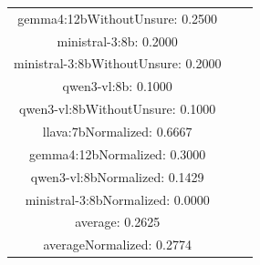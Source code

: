 \documentclass[a4paper]{article}
\begin{document}
\begin{tabular}{ccc}
gemma4:12bWithoutUnsure: 0.2500 \\ ministral-3:8b: 0.2000 \\ ministral-3:8bWithoutUnsure: 0.2000 \\ qwen3-vl:8b: 0.1000 \\ qwen3-vl:8bWithoutUnsure: 0.1000 \\ llava:7bNormalized: 0.6667 \\ gemma4:12bNormalized: 0.3000 \\ qwen3-vl:8bNormalized: 0.1429 \\ ministral-3:8bNormalized: 0.0000 \\ average: 0.2625 \\ averageNormalized: 0.2774 \end{minipage}\\
\end{tabular}

\vspace{5mm}
\end{document}

